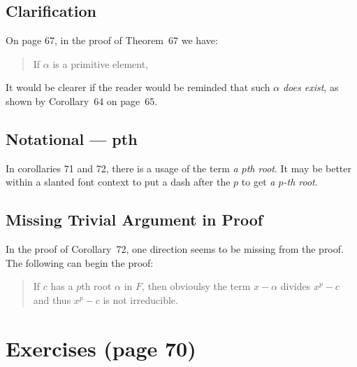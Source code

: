 \subsection{Clarification}

On page 67, in the proof  of Theorem~67 we have:
\begin{quotation}
If \(\alpha\) is a primitive element,
\end{quotation}
It would be clearer if the reader would be reminded  that such \(\alpha\)
\emph{does exist}, as shown by Corollary~64 on page~65.

\subsection{Notational --- pth}

In corollaries 71 and 72, there is a usage of the term
\textsl{a $p$th root}. It may be better within a slanted font context
to put a dash after the $p$ to get \textsl{a $p$-th root}.

\subsection{Missing Trivial Argument in Proof}

In the proof of Corollary~72, one direction seems to be missing
from the proof. The following can begin the proof:

\begin{quotation}
If $c$ has a $p$th root \(\alpha\) in $F$, then obvioulsy the term
\(x-\alpha\)
divides \(x^p-c\) and thus
\(x^p-c\)
is not irreducible.
\end{quotation}

\section{Exercises (page 70)}

